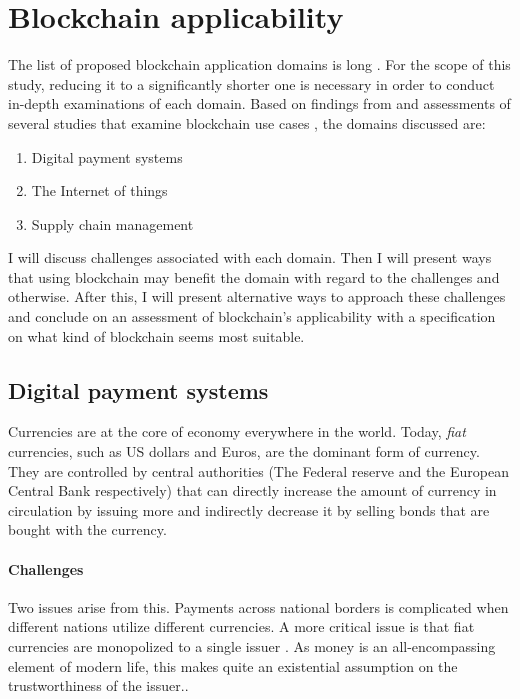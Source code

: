 \section{Blockchain applicability} \label{applications}

The list of proposed blockchain application domains is long
\cite{zileUseCases}. For the scope of this study, reducing it to a
significantly shorter one is necessary in order to conduct in-depth
examinations of each domain. Based on findings from \cite{jaoudeApplications} 
and assessments of several studies that examine blockchain use cases
\cite{sankaScalability,wustBlockchainNeed,zhengChallenges}, the
domains discussed are:

\begin{enumerate}
  \item Digital payment systems
  \item The Internet of things
  \item Supply chain management
\end{enumerate}

I will discuss challenges associated with each domain. Then I will present
ways that using blockchain may benefit the domain with regard to the
challenges and otherwise. After this, I will present alternative ways
to approach these challenges and conclude on an assessment of blockchain's
applicability with a specification on what kind of blockchain seems most
suitable.

\subsection{Digital payment systems}



Currencies are at the core of economy everywhere in the world. Today,
\textit{fiat} currencies, such as US dollars and Euros, are the
dominant form of currency. They are controlled by central authorities (The
Federal reserve and the European Central Bank respectively) that can
directly increase the amount of currency in circulation by issuing more
and indirectly decrease it by selling bonds that are bought with the
currency.

\paragraph{Challenges} Two  issues arise from this. Payments
across national borders is complicated when different nations utilize
different currencies. A more critical issue is that fiat currencies
are monopolized to a single issuer \cite{eichengreenCommodity}. As
money is an all-encompassing element of modern life, this makes quite
an existential assumption on the trustworthiness of the issuer.. 

